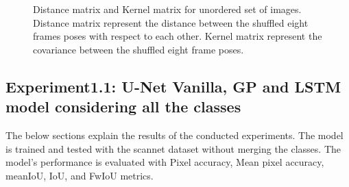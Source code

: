 	\begin{figure}
		\centering
		\qquad
		\caption{Distance matrix and Kernel matrix for unordered set of images. Distance matrix represent the distance between the shuffled eight frames poses with respect to each other. Kernel matrix represent the covariance between the shuffled eight frame poses.}%
		\label{fig:unordered_D_and_K}%
	\end{figure}
	

    \subsection{Experiment1.1: U-Net Vanilla, GP and LSTM model considering all the classes}
    
    The below sections explain the results of the conducted experiments. The model is trained and tested with the scannet dataset without merging the classes. The model's performance is evaluated with Pixel accuracy, Mean pixel accuracy, meanIoU, IoU, and FwIoU metrics.

